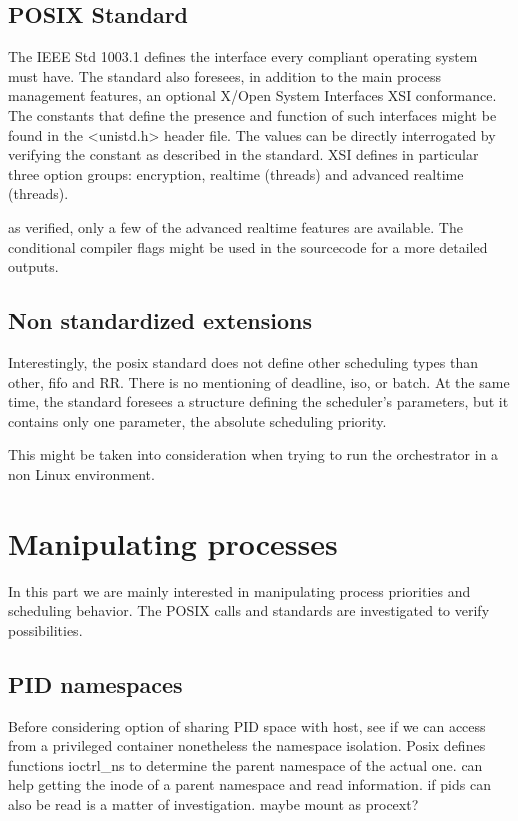 \documentclass[]{scrartcl}
\begin{document}
\subsection{POSIX Standard}

The IEEE Std 1003.1 defines the interface every compliant operating system must have. The standard also foresees, in addition to the main process management features, an optional X/Open System Interfaces XSI conformance.
The constants that define the presence and function of such interfaces might be found in the <unistd.h> header file. 
The values can be directly interrogated by verifying the constant as described in the standard.
XSI defines in particular three option groups: encryption, realtime (threads) and advanced realtime (threads). 

as verified, only a few of the advanced realtime features are available. 
The conditional compiler flags might be used in the sourcecode for a more detailed outputs. 

\subsection{Non standardized extensions}

Interestingly, the posix standard does not define other scheduling types than other, fifo and RR. 
There is no mentioning of deadline, iso, or batch. 
At the same time, the standard foresees a structure defining the scheduler's parameters, but it contains only one parameter, the absolute scheduling priority.

This might be taken into consideration when trying to run the orchestrator in a non Linux environment.


\section{Manipulating processes}

In this part we are mainly interested in manipulating process priorities and scheduling behavior. 
The POSIX calls and standards are investigated to verify possibilities.

\subsection{PID namespaces}

Before considering option of sharing PID space with host, see if we can access from a privileged container nonetheless the namespace isolation. 
Posix defines functions ioctrl\_ns to determine the parent namespace of the actual one. can help getting the inode of a parent namespace and read information. 
if pids can also be read is a matter of investigation. maybe mount as \/procext?
\end{document}
